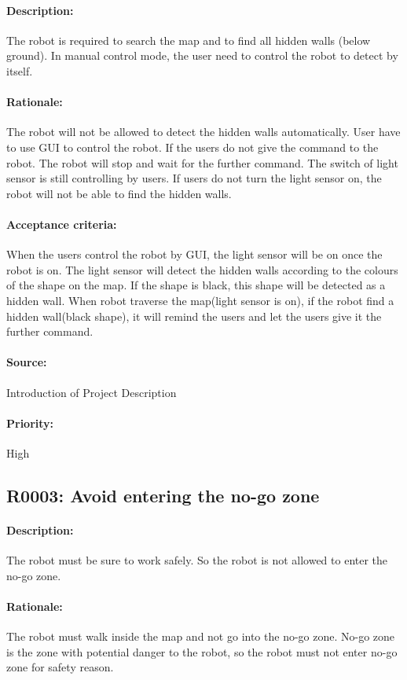 \documentclass[11pt, a4paper]{report}
\begin{document}
\paragraph{Description: }
The robot is required to search the map and to find all hidden walls (below ground). In manual control mode, the user need to control the robot to detect by itself.
\paragraph{Rationale: }
The robot will not be allowed to detect the hidden walls automatically. User have to use GUI to control the robot. If the users do not give the command  to the robot. The robot will stop and wait for the further command. The switch of light sensor is still controlling by users. If users do not turn the light sensor on, the robot will not be able to find the hidden walls.  
\paragraph{Acceptance criteria: }
When the users control the robot by GUI, the light sensor will be on once the robot is on. The light sensor will detect the hidden walls according to the colours of the shape on the map. If the shape is black, this shape will be detected as a hidden wall. When robot traverse the map(light sensor is on), if the robot find a hidden wall(black shape), it will remind the users and let the users give it the further command.
\paragraph{Source: }
 Introduction of Project Description
\paragraph{Priority: }
High



\subsection{R0003: Avoid entering the no-go zone}
\paragraph{Description:}
The robot must be sure to work safely. So the robot is not allowed to enter the no-go zone.
\paragraph{Rationale:}
 The robot must walk inside the map and not go into the no-go zone.  No-go zone is the zone with potential danger to the robot, so the robot must not enter no-go zone for safety reason.
\end{document}
